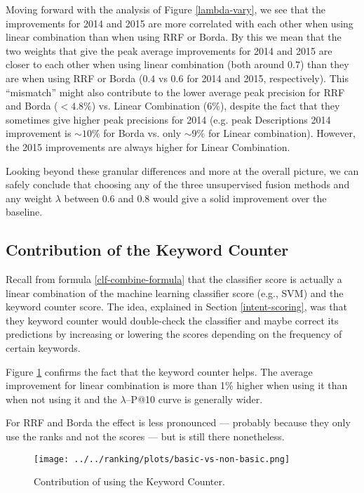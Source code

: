 Moving forward with the analysis of Figure \ref{lambda-vary}, we see that
the improvements for 2014 and 2015 are more correlated with each other when using linear combination than when using
RRF or Borda. By this we mean that the two weights that give the peak average improvements for 2014 and 2015 are closer to each other
when using linear combination (both around $0.7$) than they are when using RRF or Borda ($0.4$ vs $0.6$ for 2014 and 2015, respectively).
This ``mismatch'' might also contribute to the lower average peak precision for RRF and Borda ($<4.8\%$) 
vs. Linear Combination ($6\%$), despite the fact that they sometimes 
give higher peak precisions for 2014 (e.g. peak Descriptions 2014 improvement 
is $\sim10\%$ for Borda vs. only $\sim9\%$ for Linear combination). However, the 2015 improvements are always higher for
Linear Combination.

Looking beyond these granular differences and more at the overall picture, we can safely conclude
that choosing any of the three unsupervised fusion methods and any weight $\lambda$ between 0.6 and 0.8 would give
a solid improvement over the baseline.

\subsection{Contribution of the Keyword Counter}
Recall from formula \ref{clf-combine-formula} that the classifier score is actually 
a linear combination of the machine learning classifier score (e.g., SVM) and the keyword counter score. The idea, 
explained in Section \ref{intent-scoring}, 
was that they keyword counter would double-check the classifier and maybe correct its predictions by
increasing or lowering the scores depending on the frequency of certain keywords.

Figure \ref{basic-effect-plot}
confirms the fact that the keyword counter helps. The average improvement for linear combination is more than 1\% higher
when using it than when not using it and the $\lambda$--P@10 curve is generally wider.

For RRF and Borda the effect is less pronounced --- probably because they only use the ranks and not the scores ---
but is still there nonetheless.

\begin{figure}[h!]
\centerline{
  \texttt{[image: ../../ranking/plots/basic-vs-non-basic.png]}
  }
  \caption{Contribution of using the Keyword Counter.}
  \label{basic-effect-plot}
\end{figure}

